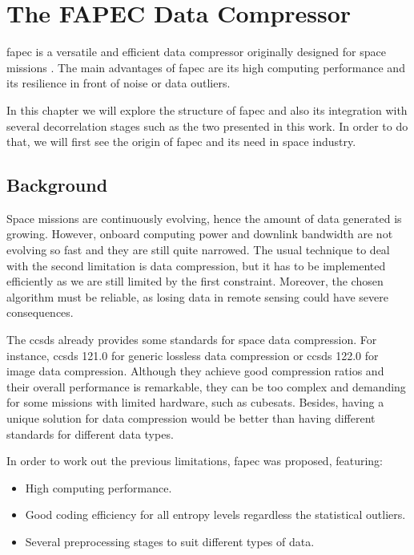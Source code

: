 \chapter{The FAPEC Data Compressor} \label{ch:fapec}
\acrfull{fapec} is a versatile and efficient data compressor originally designed for space missions \parencite{PaperFAPEC}. The main advantages of \acrshort{fapec} are its high computing performance and its resilience in front of noise or data outliers.

In this chapter we will explore the structure of \acrshort{fapec} and also its integration with several decorrelation stages such as the two presented in this work. In order to do that, we will first see the origin of \acrshort{fapec} and its need in space industry.

\section{Background}
Space missions are continuously evolving, hence the amount of data generated is growing. However, onboard computing power and downlink bandwidth are not evolving so fast and they are still quite narrowed. The usual technique to deal with the second limitation is data compression, but it has to be implemented efficiently as we are still limited by the first constraint. Moreover, the chosen algorithm must be reliable, as losing data in remote sensing could have severe consequences.

The \acrfull{ccsds} already provides some standards for space data compression. For instance, \acrshort{ccsds} 121.0 for generic lossless data compression or \acrshort{ccsds} 122.0 \parencite{ccsds122} for image data compression. Although they achieve good compression ratios and their overall performance is remarkable, they can be too complex and demanding for some missions with limited hardware, such as cubesats. Besides, having a unique solution for data compression would be better than having different standards for different data types.

In order to work out the previous limitations, \acrshort{fapec} was proposed, featuring:
\begin{itemize}
	\item High computing performance.
	\item Good coding efficiency for all entropy levels regardless the statistical outliers.
	\item Several preprocessing stages to suit different types of data.
\end{itemize}

